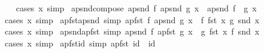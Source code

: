 \begin{isabellebody}
%
\isadelimproof
\ \ %
\endisadelimproof
%
\isatagproof
{}\isamarkupfalse%
\ {\isacharparenleft}{\kern0pt}cases\ x{\isacharparenright}{\kern0pt}\ simp%
\endisatagproof
{\isafoldproof}%
%
\isadelimproof
\isanewline
%
\endisadelimproof
\isanewline
{}\isamarkupfalse%
\ apsnd{\isacharunderscore}{\kern0pt}compose{\isacharcolon}{\kern0pt}\ {\isachardoublequoteopen}apsnd\ f\ {\isacharparenleft}{\kern0pt}apsnd\ g\ x{\isacharparenright}{\kern0pt}\ {\isacharequal}{\kern0pt}\ apsnd\ {\isacharparenleft}{\kern0pt}f\ {\isasymcirc}\ g{\isacharparenright}{\kern0pt}\ x{\isachardoublequoteclose}\isanewline
%
\isadelimproof
\ \ %
\endisadelimproof
%
\isatagproof
{}\isamarkupfalse%
\ {\isacharparenleft}{\kern0pt}cases\ x{\isacharparenright}{\kern0pt}\ simp%
\endisatagproof
{\isafoldproof}%
%
\isadelimproof
\isanewline
%
\endisadelimproof
\isanewline
{}\isamarkupfalse%
\ apfst{\isacharunderscore}{\kern0pt}apsnd\ {\isacharbrackleft}{\kern0pt}simp{\isacharbrackright}{\kern0pt}{\isacharcolon}{\kern0pt}\ {\isachardoublequoteopen}apfst\ f\ {\isacharparenleft}{\kern0pt}apsnd\ g\ x{\isacharparenright}{\kern0pt}\ {\isacharequal}{\kern0pt}\ {\isacharparenleft}{\kern0pt}f\ {\isacharparenleft}{\kern0pt}fst\ x{\isacharparenright}{\kern0pt}{\isacharcomma}{\kern0pt}\ g\ {\isacharparenleft}{\kern0pt}snd\ x{\isacharparenright}{\kern0pt}{\isacharparenright}{\kern0pt}{\isachardoublequoteclose}\isanewline
%
\isadelimproof
\ \ %
\endisadelimproof
%
\isatagproof
{}\isamarkupfalse%
\ {\isacharparenleft}{\kern0pt}cases\ x{\isacharparenright}{\kern0pt}\ simp%
\endisatagproof
{\isafoldproof}%
%
\isadelimproof
\isanewline
%
\endisadelimproof
\isanewline
{}\isamarkupfalse%
\ apsnd{\isacharunderscore}{\kern0pt}apfst\ {\isacharbrackleft}{\kern0pt}simp{\isacharbrackright}{\kern0pt}{\isacharcolon}{\kern0pt}\ {\isachardoublequoteopen}apsnd\ f\ {\isacharparenleft}{\kern0pt}apfst\ g\ x{\isacharparenright}{\kern0pt}\ {\isacharequal}{\kern0pt}\ {\isacharparenleft}{\kern0pt}g\ {\isacharparenleft}{\kern0pt}fst\ x{\isacharparenright}{\kern0pt}{\isacharcomma}{\kern0pt}\ f\ {\isacharparenleft}{\kern0pt}snd\ x{\isacharparenright}{\kern0pt}{\isacharparenright}{\kern0pt}{\isachardoublequoteclose}\isanewline
%
\isadelimproof
\ \ %
\endisadelimproof
%
\isatagproof
{}\isamarkupfalse%
\ {\isacharparenleft}{\kern0pt}cases\ x{\isacharparenright}{\kern0pt}\ simp%
\endisatagproof
{\isafoldproof}%
%
\isadelimproof
\isanewline
%
\endisadelimproof
\isanewline
{}\isamarkupfalse%
\ apfst{\isacharunderscore}{\kern0pt}id\ {\isacharbrackleft}{\kern0pt}simp{\isacharbrackright}{\kern0pt}{\isacharcolon}{\kern0pt}\ {\isachardoublequoteopen}apfst\ id\ {\isacharequal}{\kern0pt}\ id{\isachardoublequoteclose}\isanewline

\end{isabellebody}
